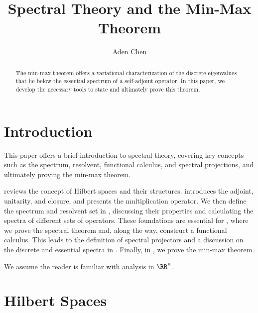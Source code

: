 \documentclass[oneside,reqno,letterpaper]{amsart}
\title[Spectral Theory and the Min-Max Theorem]{Spectral Theory and the Min-Max Theorem}
\author{Aden Chen}
\begin{document}
\begin{abstract}
  The min-max theorem offers a variational characterization of the discrete eigenvalues that lie below the essential spectrum of a self-adjoint operator. 
  In this paper, we develop the necessary tools to state and ultimately prove this theorem. 
\end{abstract}

\maketitle

\tableofcontents




\section*{Introduction}
This paper offers a brief introduction to spectral theory, covering key concepts such as the spectrum, resolvent, functional calculus, and spectral projections, and ultimately proving the min-max theorem. 

 reviews the concept of Hilbert spaces and their structures. 
 introduces the adjoint, unitarity, and closure, and presents the multiplication operator. 
We then define the spectrum and resolvent set in , discussing their properties and calculating the spectra of different sets of operators. 
These foundations are essential for , where we prove the spectral theorem and, along the way, construct a functional calculus.
This leads to the definition of spectral projectors and a discussion on the discrete and essential spectra in . 
Finally, in , we prove the min-max theorem. 

We assume the reader is familiar with analysis in \(\RR^n\). 






  
\section{Hilbert Spaces}
\label{sec:hilbert}
\end{document}
